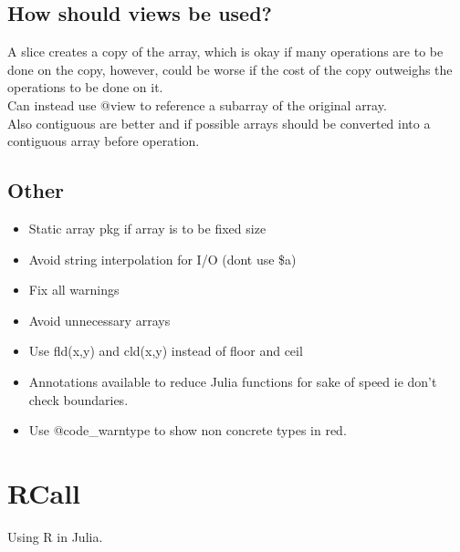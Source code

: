 \documentclass[11pt]{scrartcl} %
\begin{document}
\subsection{How should views be used?}

A slice creates a copy of the array, which is okay if many operations are to be done on the
copy, however, could be worse if the cost of the copy outweighs the operations to be done on it.\\

Can instead use @view to reference a subarray of the original array.\\

Also contiguous are better and if possible arrays should be converted into a contiguous array
before operation.

\subsection{Other}

\begin{itemize}
	\item Static array pkg if array is to be fixed size
	\item Avoid string interpolation for I/O (dont use \$a)
	\item Fix all warnings
	\item Avoid unnecessary arrays
	\item Use fld(x,y) and cld(x,y) instead of floor and ceil
	\item Annotations available to reduce Julia functions for sake of speed ie don't check boundaries.
	\item Use @code\_warntype to show non concrete types in red.
\end{itemize}

\section{RCall}

Using R in Julia.


\end{document}
